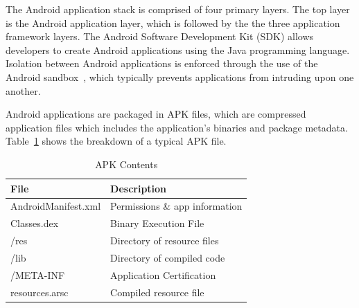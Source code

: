 \documentclass[conference]{IEEEtran}
\begin{document}
The Android application stack is comprised of four primary layers. The top layer is the Android application layer, which is followed by the the three application framework layers. The Android Software Development Kit (SDK) allows developers to create Android applications using the Java programming language. Isolation between Android applications is enforced through the use of the Android sandbox~\cite{androidsecuritytips_url}, which typically prevents applications from intruding upon one another.


Android applications are packaged in APK files, which are compressed application files which includes the application's binaries and package metadata. Table~\ref{Table:apkcontents} shows the breakdown of a typical APK file.

\begin{table}[ht]%
\begin{center}
\caption{APK Contents}
\label{Table:apkcontents}
  \begin{tabular}{| l | l | } \hline

    \bfseries File & \bfseries Description \\ \hline
    AndroidManifest.xml & Permissions \& app information \\ \hline
    Classes.dex & Binary Execution File \\ \hline
    /res & Directory of resource files \\ \hline
    /lib & Directory of compiled code \\ \hline
    /META-INF & Application Certification \\ \hline
    resources.arsc & Compiled resource file \\ \hline
  \end{tabular}
  \end{center}
\end{table}
\end{document}

